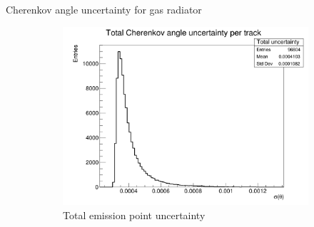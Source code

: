 \documentclass{beamer}
\begin{document}
\begin{frame}{Cherenkov angle uncertainty for gas radiator}
\begin{figure}
    \begin{subfigure}{0.35\textwidth}
      \includegraphics[width = 1.0\textwidth]{Plots/TotalCherenkovUncertainty_Barrel_Gas.png}
      \caption{Total emission point uncertainty}
    \end{subfigure}
    \caption{}
  \end{figure}
\end{frame}
\end{document}
